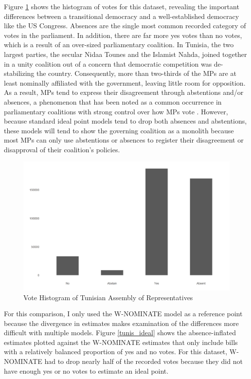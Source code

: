 	Figure \ref{tunis_arp_hist} shows the histogram of votes for this dataset, revealing the important differences between a transitional democracy and a well-established democracy like the US Congress. Absences are the single most common recorded category of votes in the parliament. In addition, there are far more yes votes than no votes, which is a result of an over-sized parliamentary coalition. In Tunisia, the two largest parties, the secular Nidaa Tounes and the Islamist Nahda, joined together in a unity coalition out of a concern that democratic competition was de-stabilizing the country. Consequently, more than two-thirds of the MPs are at least nominally affiliated with the government, leaving little room for opposition. As a result, MPs tend to express their disagreement through abstentions and/or absences, a phenomenon that has been noted as a common occurrence in parliamentary coalitions with strong control over how MPs vote \parencite{brauninger2016}. However, because standard ideal point models tend to drop both absences and abstentions, these models will tend to show the governing coalition as a monolith because most MPs can only use abstentions or absences to register their disagreement or disapproval of their coalition's policies. 
	
	\begin{figure}
		\centering
		\caption{Vote Histogram of Tunisian Assembly of Representatives}\label{tunis_arp_hist}
		\includegraphics[width=.8\linewidth]{arp_hist}
	\end{figure}

	For this comparison, I only used the W-NOMINATE model as a reference point because the divergence in estimates makes examination of the differences more difficult with multiple models. Figure \ref{tunis_ideal} shows the absence-inflated estimates plotted against the W-NOMINATE estimates that only include bills with a relatively balanced proportion of yes and no votes. For this dataset, W-NOMINATE had to drop nearly half of the recorded votes because they did not have enough yes or no votes to estimate an ideal point.
	

